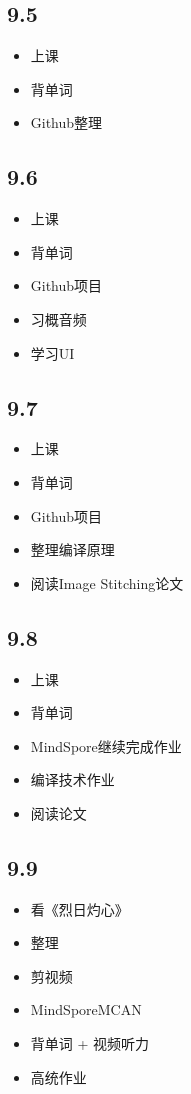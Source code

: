 \documentclass[UTF8]{ctexart}
\begin{document}
\subsection*{9.5}
\begin{itemize}
    \item 上课
    \item 背单词
    \item Github整理
\end{itemize}
\subsection*{9.6}
\begin{itemize}
    \item 上课
    \item 背单词
    \item Github项目
    \item 习概音频
    \item 学习UI
\end{itemize}
\subsection*{9.7}
\begin{itemize}
    \item 上课
    \item 背单词
    \item Github项目
    \item 整理编译原理
    \item 阅读Image Stitching论文
\end{itemize}
\subsection*{9.8}
\begin{itemize}
    \item 上课
    \item 背单词
    \item MindSpore继续完成作业
    \item 编译技术作业
    \item 阅读论文
\end{itemize}
\subsection*{9.9}
\begin{itemize}
    \item 看《烈日灼心》
    \item 整理
    \item 剪视频
    \item MindSporeMCAN
    \item 背单词 + 视频听力
    \item 高统作业
\end{itemize}
\end{document}
